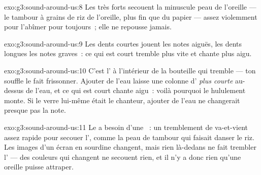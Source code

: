 \begin{solution}{exo:g3:sound-around-us:8}
Les  très forts secouent la minuscule peau de l'oreille --- le
tambour à grains de riz de l'oreille, plus fin que du papier --- assez
violemment pour l'abîmer pour toujours~; elle ne repousse jamais.
\end{solution}

\begin{solution}{exo:g3:sound-around-us:9}
Les dents courtes jouent les notes aiguës, les dents longues les
notes graves~: ce qui est court tremble plus vite et chante plus
aigu.
\end{solution}

\begin{solution}{exo:g3:sound-around-us:10}
C'est l' à l'intérieur de la bouteille qui tremble --- ton souffle
le fait frissonner. Ajouter de l'eau laisse une colonne d'
\emph{plus courte} au-dessus de l'eau, et ce qui est court chante
aigu~: voilà pourquoi le hululement monte. Si le verre lui-même était
le chanteur, ajouter de l'eau ne changerait presque pas la note.
\end{solution}

\begin{solution}{exo:g3:sound-around-us:11}
Le  a besoin d'une \emph{}~: un tremblement de va-et-vient
assez rapide pour secouer l', comme la peau de tambour qui faisait
danser le riz. Les images d'un écran en sourdine changent, mais rien
là-dedans ne fait trembler l' --- des couleurs qui changent ne
secouent rien, et il n'y a donc rien qu'une oreille puisse attraper.
\end{solution}
